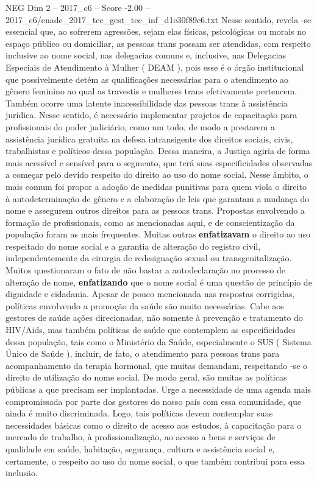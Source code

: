 \begin{textsample}{NEG Dim 2 – 2017\_c6 – Score -2.00 – 2017\_c6/enade\_2017\_tec\_gest\_tec\_inf\_d1e30f89c6.txt}
Nesse sentido, revela -se essencial que, ao sofrerem agressões, sejam elas físicas, psicológicas ou morais no espaço público ou domiciliar, as pessoas trans possam ser atendidas, com respeito inclusive ao nome social, nas delegacias comuns e, inclusive, nas Delegacias Especiais de Atendimento à Mulher ( DEAM ), pois esse é o órgão institucional que possivelmente detém as qualificações necessárias para o atendimento ao gênero feminino ao qual as travestis e mulheres trans efetivamente pertencem.
Também ocorre uma latente inacessibilidade das pessoas trans à assistência jurídica.
Nesse sentido, é necessário implementar projetos de capacitação para profissionais do poder judiciário, como um todo, de modo a prestarem a assistência jurídica gratuita na defesa intransigente dos direitos sociais, civis, trabalhistas e políticos dessa população.
Dessa maneira, a Justiça agiria de forma mais acessível e sensível para o segmento, que terá suas especificidades observadas a começar pelo devido respeito do direito ao uso do nome social.
Nesse âmbito, o mais comum foi propor a adoção de medidas punitivas para quem viola o direito à autodeterminação de gênero e a elaboração de leis que garantam a mudança do nome e assegurem outros direitos para as pessoas trans.
Propostas envolvendo a formação de profissionais, como as mencionadas aqui, e de conscientização da população foram as mais frequentes.
Muitas outras \textbf{enfatizavam} o direito ao uso respeitado do nome social e a garantia de alteração do registro civil, independentemente da cirurgia de redesignação sexual ou transgenitalização.
Muitos questionaram o fato de não bastar a autodeclaração no processo de alteração de nome, \textbf{enfatizando} que o nome social é uma questão de princípio de dignidade e cidadania.
Apesar de pouco mencionada nas respostas corrigidas, políticas envolvendo a promoção da saúde são muito necessárias.
Cabe aos gestores de saúde ações direcionadas, não somente à prevenção e tratamento do HIV/Aids, mas também políticas de saúde que contemplem as especificidades dessa população, tais como o Ministério da Saúde, especialmente o SUS ( Sistema Único de Saúde ), incluir, de fato, o atendimento para pessoas trans para acompanhamento da terapia hormonal, que muitas demandam, respeitando -se o direito de utilização do nome social.
De modo geral, são muitas as políticas públicas a que precisam ser implantadas.
Urge a necessidade de uma agenda mais compromissada por parte dos gestores do nosso país com essa comunidade, que ainda é muito discriminada.
Logo, tais políticas devem contemplar suas necessidades básicas como o direito de acesso aos estudos, à capacitação para o mercado de trabalho, à profissionalização, ao acesso a bens e serviços de qualidade em saúde, habitação, segurança, cultura e assistência social e, certamente, o respeito ao uso do nome social, o que também contribui para essa inclusão.

\end{textsample}
